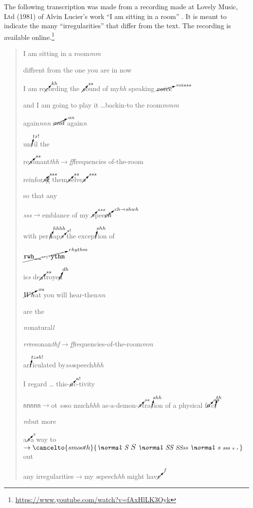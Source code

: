 The following transcription was made from a recording made at Lovely Music, Ltd (1981) of Alvin Lucier's work ``I am sitting in a room'' \parencite{Luc70:Iam}. It is meant to indicate the many ``irregularities'' that differ from the text. The recording is available online.\footnote{\url{https://www.youtube.com/watch?v=fAxHlLK3Oyk}} 
\begin{quote}
I am sitting in a room\textit{mm}\par
diffrent from the one you are in now\par
{}
I am re$\cancelto{kh}{c}$ording the $\cancelto{ss}{s}$ound of my\textit{hh} speaking $\cancelto{voisss}{voice}$ \par
{}
and I am going to play it \dots backin-to the room\textit{mmm} \par
again\textit{nnn} $\cancelto{an}{and}$  again\textit{n} \par
{}
un$\cancelto{tx!}{t}$il the\par
re$\cancelto{ss}{s}$onant\textit{thh$\rightarrow$ff}frequencies of-the-room\par
{}
reinfor$\cancelto{sss}{s}\xcancel{e}$ them$\cancelto{ss}{s}$elve$\cancelto{sss}{s}$\par
{}
so that any \par
\textit{{\small s}ss}$\rightarrow$emblance of my $\cancelto{sss}{s}$pee$\cancelto{ch\rightarrow shwh}{ch}$\par
{}
with per$\cancelto{hhhh}{h}$ap$\cancelto{s!}{s}$ the excep$\cancelto{shh}{t}$ion of\par
$\cancelto{rhythm}{\texttt{rwh\_\_$\cdot\cdot$.$\cdot$ythm}}$\par
is\textit{s} de$\cancelto{ss}{s}$troye$\cancelto{dh}{d}$\par
\par\par
$\cancelto{ou}{Wh}$at you will hear-then\textit{nn} \par
{}
are the\par
\quad \textit{nn}natural\textit{l}\par
\quad \quad \textit{rr}resonan\textit{thf$\rightarrow$ff}requencies-of-the-room\textit{mm}\par
ar$\cancelto{tzsh!}{t}$iculated by\textit{sss}speech\textit{hhh} \par
I regard \dots{} this-$\cancelto{a!}{a}$c-tivity\par
{}
\texttt{nnnnn$\rightarrow$}ot \textit{ss}so much\textit{hhh} as-a-demon-$\cancelto{ss}{s}$tra$\cancelto{shh}{t}$ion of a physical f$\cancelto{aa}{a}$c$\cancelto{th}{t}$\par
{}
\textit{m}but more\par
{}
a$\cancelto{z}{s}$a way {} to$\rightarrow\cancelto{smooth}{\textit{{\normal S }{\large S }{\normal SS }{\small SSss }{\normal s }{\footnotesize sss  }{\scriptsize s  }{\tiny s }}}$\normal out \par
any irregularities$\rightarrow$my \textit{s}speech\textit{hh} might hav$\cancelto{f}{e}$
\end{quote}

